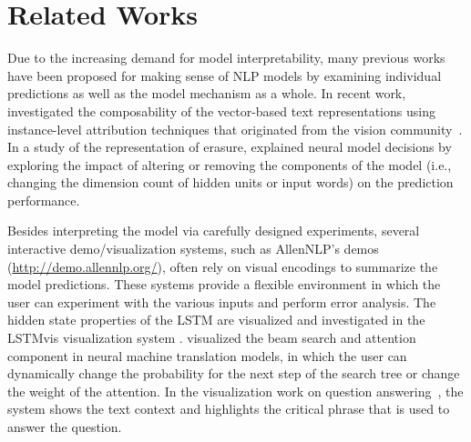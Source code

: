 \section{Related Works}
Due to the increasing demand for model interpretability, many previous works have been proposed for making sense of NLP models by examining individual predictions as well as the model mechanism as a whole. 
%
In recent work,~\citet{LiChenHovy2015} investigated the composability of the vector-based text representations using instance-level attribution techniques that originated from the vision community~\cite[e.g.,][]{ZeilerFergus2014}. 
%
In a study of the representation of erasure, \citet{li2016understanding} explained neural model decisions by exploring the impact of altering or removing the components of the model (i.e., changing the dimension count of hidden units or input words) on the prediction performance. 

Besides interpreting the model via carefully designed experiments, several interactive demo/visualization systems, such as AllenNLP's demos (\url{http://demo.allennlp.org/}), often rely on visual encodings to summarize the model predictions. These systems provide a flexible environment in which the user can experiment with the various inputs and perform error analysis.
The hidden state properties of the LSTM are visualized and investigated in the LSTMvis visualization system \cite{StrobeltGehrmannPfister2018}.
\citet{lee2017interactive} visualized the beam search and attention component in neural machine translation models, in which the user can dynamically change the probability for the next step of the search tree or change the weight of the attention.
In the visualization work on question answering~\cite{ruckle2017end}, the system shows the text context and highlights the critical phrase that is used to answer the question. 


